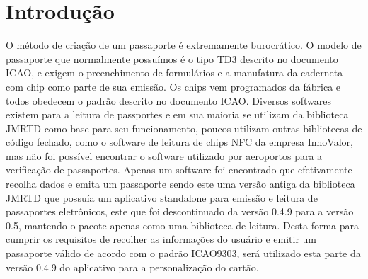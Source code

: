 \documentclass{article}
\begin{document}
	\section{Introdução}
		\begin{justify}
			
			\hspace{2cm} O método de criação de um passaporte é extremamente burocrático\cite{HOWPASSPORT}. O modelo de passaporte que normalmente possuímos é o tipo TD3 descrito no documento ICAO\cite{ICAO}, e exigem o preenchimento de formulários e a manufatura da caderneta com chip como parte de sua emissão. Os chips vem programados da fábrica e todos obedecem o padrão descrito no documento ICAO\cite{USPASSPORT}.
			\hspace*{2cm} Diversos softwares existem para a leitura de passportes e em sua maioria se utilizam da biblioteca JMRTD\cite{JMRTD} como base para seu funcionamento, poucos utilizam outras bibliotecas de código fechado, como o software de leitura de chips NFC da empresa InnoValor\cite{INNOVALOR}, mas não foi possível encontrar o software utilizado por aeroportos para a verificação de passaportes. Apenas um software foi encontrado que efetivamente recolha dados e emita um passaporte sendo este uma versão antiga da biblioteca JMRTD que possuía um aplicativo standalone para emissão e leitura de passaportes eletrônicos, este que foi descontinuado da versão 0.4.9 para a versão 0.5, mantendo o pacote apenas como uma biblioteca de leitura. 
			\hspace*{2cm} Desta forma para cumprir os requisitos de recolher as informações do usuário e emitir um passaporte válido de acordo com o padrão ICAO9303, será utilizado esta parte da versão 0.4.9 do aplicativo para a personalização do cartão.

			
		\end{justify}
\end{document}
